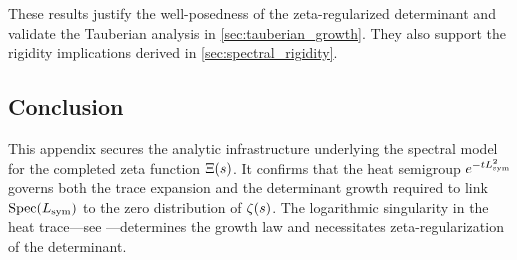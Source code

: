 These results justify the well-posedness of the zeta-regularized determinant and validate the Tauberian analysis in \cref{sec:tauberian_growth}. They also support the rigidity implications derived in \cref{sec:spectral_rigidity}.

\subsection*{Conclusion}

This appendix secures the analytic infrastructure underlying the spectral model for the completed zeta function \( \Xi(s) \). It confirms that the heat semigroup \( e^{-t L_{\mathrm{sym}}^2} \) governs both the trace expansion and the determinant growth required to link \( \operatorname{Spec}(L_{\mathrm{sym}}) \) to the zero distribution of \( \zeta(s) \). The logarithmic singularity in the heat trace—see —determines the growth law and necessitates zeta-regularization of the determinant.
